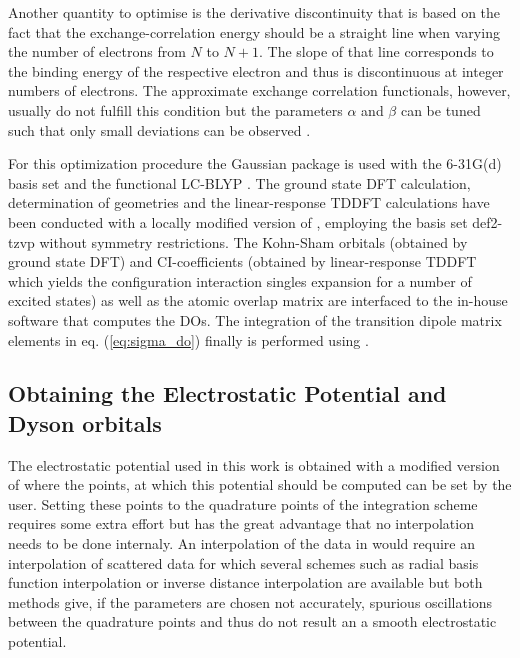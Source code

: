 Another quantity to optimise is the derivative discontinuity \cite{derdis,sanchez,Autschbach} that is based on the fact that the exchange-correlation energy should be a straight line when varying the number of electrons from $N$ to $N+1$.
The slope of that line corresponds to the binding energy of the respective electron and thus is discontinuous at integer numbers of electrons.
The approximate exchange correlation functionals, however, usually do not fulfill this condition but the parameters $\alpha$ and $\beta$ can be tuned such that only small deviations can be observed \cite{Bokareva}.

For this optimization procedure the Gaussian package  \cite{g09} is used with the 6-31G(d) \cite{6-31g,6-31gd} basis set and the functional LC-BLYP \cite{lcblyp}. 
The ground state DFT calculation, determination of geometries and the linear-response TDDFT calculations have been conducted with a locally modified version of  \cite{nwchem}, employing the basis set def2-tzvp \cite{def2tzvp} without symmetry restrictions.
The Kohn-Sham orbitals (obtained by ground state DFT) and CI-coefficients (obtained by linear-response TDDFT which yields the configuration interaction singles expansion for a number of excited states) as well as the atomic overlap matrix are interfaced to the in-house software  \cite{MAgg} that computes the DOs.
The integration of the transition dipole matrix elements in eq. (\ref{eq:sigma_do}) finally is performed using  \cite{ezDyson}.

\subsection{Obtaining the Electrostatic Potential and Dyson orbitals}
The electrostatic potential used in this work is obtained with a modified version of  \cite{nwchem} where the points, at which this potential should be computed can be set by the user.
Setting these points to the quadrature points of the integration scheme requires some extra effort but has the great advantage that no interpolation needs to be done internaly.
An interpolation of the data in  \cite{FreeWilly} would require an interpolation of scattered data for which several schemes such as radial basis function interpolation or inverse distance interpolation are available but both methods give, if the parameters are chosen not accurately, spurious oscillations between the quadrature points and thus do not result an a smooth electrostatic potential.

